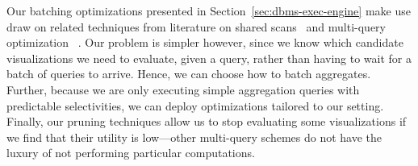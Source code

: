  Our batching optimizations
presented in Section~\ref{sec:dbms-exec-engine} make use draw on
related techniques from literature on shared
scans~\cite{Fernandez:1994:RBW:191843.191947} and multi-query
optimization
~\cite{DBLP:journals/tods/Sellis88,DBLP:journals/pvldb/KementsietsidisNCV08,DBLP:journals/pvldb/WangC13}.
Our problem is simpler however, since we know which candidate
visualizations we need to evaluate, given a query, rather than having
to wait for a batch of queries to arrive.  Hence, we can choose how to
batch aggregates.  Further, because we are only executing simple
aggregation queries with predictable selectivities, we can deploy
optimizations tailored to our setting.  Finally, our pruning
techniques allow us to stop evaluating some visualizations if we find
that their utility is low---other multi-query schemes do not have the
luxury of not performing particular computations.












